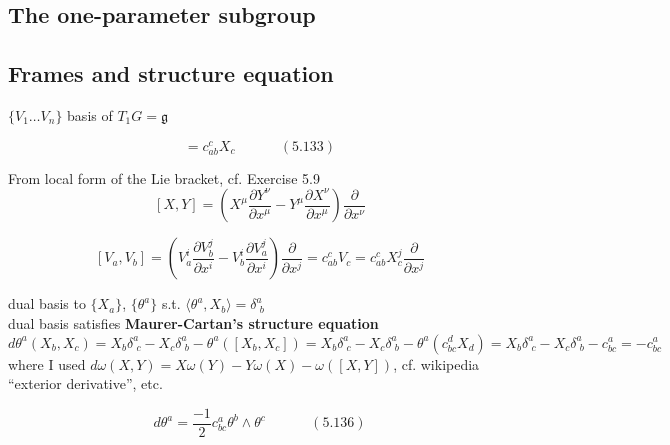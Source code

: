 \documentclass{book}
\begin{document}
\subsection{The one-parameter subgroup }

\subsection{Frames and structure equation }

$\lbrace V_1 \dots V_n \rbrace$ basis of $T_1G = \mathfrak{g}$



\begin{equation}
[X_a, X_b] = c_{ab}^c X_c  \quad \quad \quad \, (5.133)
\end{equation}

From local form of the Lie bracket, cf. Exercise 5.9 
\[
[X,Y] = \left( X^{\mu} \frac{ \partial Y^{\nu}}{ \partial x^{\mu }} - Y^{\mu} \frac{ \partial X^{\nu}}{ \partial x^{\mu} } \right) \frac{ \partial }{ \partial x^{\nu}}
\]

\[
[V_a,V_b] = \left( V_a^i \frac{ \partial V_b^j}{ \partial x^i} - V_b^i \frac{ \partial V_a^j}{ \partial x^i} \right) \frac{ \partial }{ \partial x^j} = c^c_{ab}V_c = c^c_{ab} X_c^j \frac{ \partial }{ \partial x^j}
\]

dual basis to $\lbrace X_a \rbrace$, $\lbrace \theta^a \rbrace$ s.t. $\langle \theta^a, X_b \rangle = \delta^a_{ \, \, b}$ \\
dual basis satisfies \textbf{Maurer-Cartan's structure equation}
\[
d\theta^a(X_b,X_c) = X_b \delta^a_{ \, \, c} - X_c \delta^a_{ \, \, b} - \theta^a([X_b,X_c]) = X_b\delta^a_{ \, \, c} - X_c \delta^a_{ \, \, b} - \theta^a(c^d_{bc} X_d ) = X_b \delta^a_{ \, \, c} - X_c \delta^a_{ \, \, b} - c^a_{bc} = -c^a_{bc}
\]
where I used $d\omega(X,Y) = X\omega(Y) - Y\omega(X) - \omega([X,Y])$, cf. wikipedia ``exterior derivative'', etc.

\begin{equation}
  d\theta^a = \frac{-1}{2}c^a_{bc} \theta^b \wedge \theta^c \quad \quad \quad \, (5.136)
\end{equation}



\end{document}
